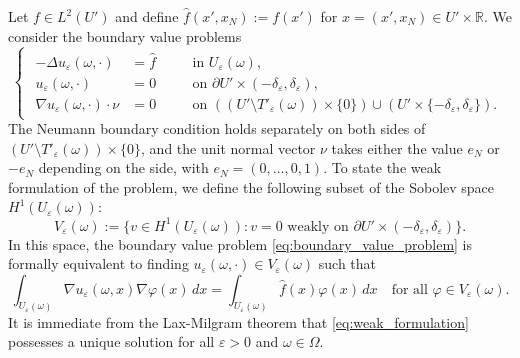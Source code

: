 \documentclass{article}
\numberwithin{equation}{section}
\theoremstyle{definition}
\theoremstyle{remark}
\begin{document}
Let $f \in L^2(U')$ and define $\hat{f}(x', x_N) := f(x')$ for $x = (x', x_N) \in U' \times \mathbb{R}$. We consider the boundary value problems
\begin{equation} \label{eq:boundary_value_problem}
    \begin{cases}
        \begin{alignedat}{2}
            -\Delta u_\varepsilon(\omega, \cdot) &= \hat{f} \quad && \text{in } U_\varepsilon(\omega), \\
            u_\varepsilon(\omega, \cdot) &= 0 \quad && \text{on } \partial U' \times (-\delta_\varepsilon, \delta_\varepsilon), \\
            \nabla u_\varepsilon(\omega, \cdot) \cdot \nu &= 0 \quad && \text{on } ((U' \setminus T'_\varepsilon(\omega)) \times \{0\}) \cup (U' \times \{-\delta_\varepsilon, \delta_\varepsilon\}).
        \end{alignedat}
    \end{cases}
\end{equation}
The Neumann boundary condition holds separately on both sides of $(U' \setminus T'_\varepsilon(\omega)) \times \{0\}$, and the unit normal vector $\nu$ takes either the value $e_N$ or $-e_N$ depending on the side, with $e_N = (0, \dots, 0, 1)$. To state the weak formulation of the problem, we define the following subset of the Sobolev space $H^1(U_\varepsilon(\omega))$:
\[
V_\varepsilon(\omega) := \{v \in H^1(U_\varepsilon(\omega)) : v = 0 \text{ weakly on } \partial U' \times (-\delta_\varepsilon, \delta_\varepsilon)\}.
\]
In this space, the boundary value problem \eqref{eq:boundary_value_problem} is formally equivalent to finding $u_\varepsilon(\omega, \cdot) \in V_\varepsilon(\omega)$ such that
\begin{equation} \label{eq:weak_formulation}
    \int_{U_\varepsilon(\omega)} \nabla u_\varepsilon(\omega, x) \nabla \varphi(x) \, dx = \int_{U_\varepsilon(\omega)} \hat{f}(x) \varphi(x) \, dx \quad \text{for all } \varphi \in V_\varepsilon(\omega).
\end{equation}
It is immediate from the Lax-Milgram theorem that \eqref{eq:weak_formulation} possesses a unique solution for all $\varepsilon > 0$ and $\omega \in \Omega$.
\end{document}
